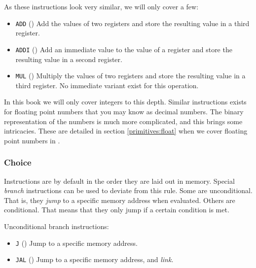 As these instructions look very similar, we will only cover a few:
\begin{itemize}
  \item \texttt{ADD} () Add the values of two registers and store the resulting value in a third register.
  \item \texttt{ADDI} () Add an immediate value to the value of a register and store the resulting value in a second register.
  \item \texttt{MUL} () Multiply the values of two registers and store the resulting value in a third register. No immediate variant exist for this operation.
\end{itemize}

In this book we will only cover integers to this depth. Similar instructions exists for floating point numbers that you may know as decimal numbers. The binary representation of the numbers is much more complicated, and this brings some intricacies. These are detailed in section \ref{primitives:float} when we cover floating point numbers in \csharp.

\subsubsection{Choice}


Instructions are by default  in the order they are laid out in memory. Special \textsl{branch} instructions can be used to deviate from this rule. Some are unconditional. That is, they \textsl{jump} to a specific memory address when evaluated. Others are conditional. That means that they only jump if a certain condition is met.

Unconditional branch instructions:
\begin{itemize}
  \item \texttt{J} () Jump to a specific memory address.
  \item \texttt{JAL} () Jump to a specific memory address, and \textsl{link}.
\end{itemize}

